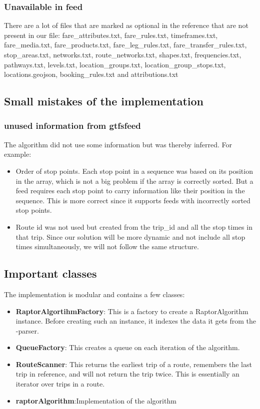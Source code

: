 \subsubsection{Unavailable in feed}
There are a lot of files that are marked as optional in the reference \cite{noauthor_gtfs_2022} that are not present in our file:
fare\_attributes.txt,
    fare\_rules.txt,
    timeframes.txt,
    fare\_media.txt,
    fare\_products.txt,
    fare\_leg\_rules.txt,
    fare\_transfer\_rules.txt,
    stop\_areas.txt,
    networks.txt,
    route\_networks.txt,
    shapes.txt,
    frequencies.txt,
    pathways.txt,
    levels.txt,
    location\_groups.txt,
    location\_group\_stops.txt,
    locations.geojson,
    booking\_rules.txt and
    attributions.txt

\subsection{Small mistakes of the implementation}
\subsubsection{unused information from gtfsfeed}
The algorithm did not use some information but was thereby inferred. For example:
\begin{itemize}
    \item Order of stop points. Each stop point in a sequence was based on its position in the array, which is not a big problem if the array is correctly sorted. But a  feed requires each stop point to carry information like their position in the sequence. This is more correct since it supports feeds with incorrectly sorted stop points.
    \item Route id was not used but created from the trip\_id and all the stop times in that trip. Since our solution will be more dynamic and not include all stop times simultaneously, we will not follow the same structure.
\end{itemize}
\subsection{Important classes}
The  implementation is modular and contains a few classes:
\begin{itemize}
    \item \textbf{RaptorAlgortihmFactory}: This is a factory to create a RaptorAlgorithm instance. Before creating such an instance, it indexes the data it gets from the -parser.
    \item \textbf{QueueFactory}: This creates a queue on each iteration of the  algorithm.
    \item \textbf{RouteScanner}: This returns the earliest trip of a route, remembers the last trip in reference, and will not return the trip twice. This is essentially an iterator over trips in a route.
    \item \textbf{raptorAlgorithm}:Implementation of the  algorithm
\end{itemize}
